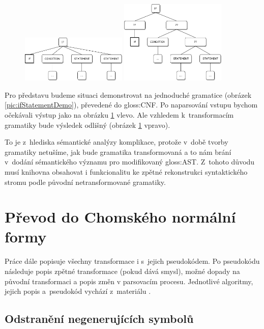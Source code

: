 	\begin{figure}
		\includegraphics[width=0.45\textwidth]{img/DemoIfStatement}
		\includegraphics[width=0.45\textwidth]{img/DemoIfStatementWithTransformation}
		\label{pic:ifStatemenAST}
	\end{figure}
	
	Pro představu budeme situaci demonstrovat na jednoduché gramatice (obrázek \ref{pic:ifStatementDemo}), převedené do \gls{gloss:CNF}.
	Po naparsování vstupu bychom očekávali výstup jako na obrázku \ref{pic:ifStatemenAST} vlevo. Ale vzhledem k~transformacím gramatiky bude výsledek odlišný (obrázek \ref{pic:ifStatemenAST} vpravo).
	
	To je z~hlediska sémantické analýzy komplikace, protože v~době tvorby gramatiky netušíme, jak bude gramatika transformovaná a to nám brání v~dodání sémantického významu pro modifikovaný \gls{gloss:AST}. Z~tohoto důvodu musí knihovna obsahovat i funkcionalitu ke zpětné rekonstrukci syntaktického stro\-mu podle původní netransformované gramatiky.
	
	\section{Převod do Chomského normální formy} 
	
	Práce dále popisuje všechny transformace i s~jejich pseudokódem. Po pseudokódu následuje popis zpětné transformace (pokud dává smysl), možné dopady na původní transformaci a popis změn v parsovacím procesu. Jednotlivé algoritmy, jejich popis a~pseudokód vychází z~materiálu \cite{Meduna:2014:FLC:2636678}.
	
	\subsection{Odstranění negenerujících symbolů}
	
